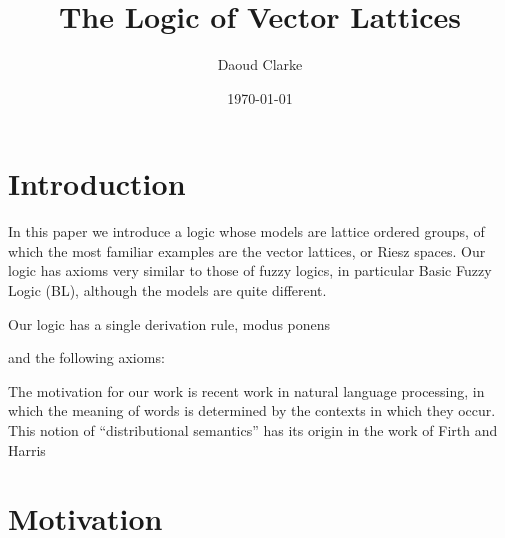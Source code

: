 \documentclass[preprint,3p]{elsarticle}
\author{Daoud Clarke}
\date{\today}
\title{The Logic of Vector Lattices}
\begin{document}
\maketitle


\section{Introduction}

In this paper we introduce a logic whose models are lattice
ordered groups, of which the most familiar examples are the vector
lattices, or Riesz spaces. Our logic has axioms very similar to those
of fuzzy logics, in particular Basic Fuzzy Logic (BL), although the
models are quite different.

Our logic has a single derivation rule, modus ponens

and the
following axioms:



The motivation for our work is recent work in natural language
processing, in which the meaning of words is determined by the
contexts in which they occur. This notion of ``distributional
semantics'' has its origin in the work of Firth and Harris

\section{Motivation}
\end{document}
